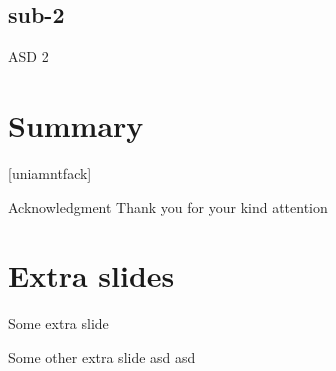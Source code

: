 \documentclass[aspectratio=169]{beamer}
\begin{document}
\subsection{sub-2}
\begin{frame}{ASD 2}
\end{frame}

\section{Summary}

{
    [uniamntfack] %
    \begin{frame}[plain]{Acknowledgment}
        Thank you for your kind attention
    \end{frame}
}

\section*{Extra slides} %
\begin{frame}{Some extra slide}
\end{frame}
{
    \begin{frame}{Some other extra slide}
        asd asd
    \end{frame}
}
\end{document}
